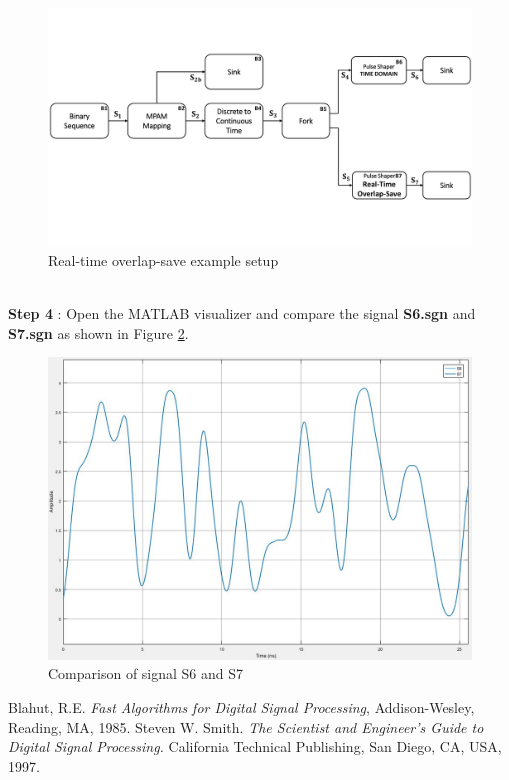 \begin{figure}[h]
	\centering
	\includegraphics[width=12cm]{./algorithms/overlap_save/figures/realTimeOverlapSave.pdf}
	\caption{Real-time overlap-save example setup}\label{realTimeOverlapSave}
\end{figure}\\
\textbf{Step 4} : Open the MATLAB visualizer and compare the signal \textbf{S6.sgn} and \textbf{S7.sgn} as shown in Figure \ref{S6S7}.
\begin{figure}[h]
	\centering
	\includegraphics[width=12cm]{./algorithms/overlap_save/figures/S6_S7.jpg}
	\caption{Comparison of signal S6 and S7}\label{S6S7}
\end{figure}

\begin{thebibliography}{1}
  Blahut, R.E. {\em Fast Algorithms for Digital Signal Processing}, Addison-Wesley, Reading, MA,
 1985.
  Steven W. Smith. {\em The Scientist and Engineer's Guide to Digital Signal Processing.} California Technical Publishing, San Diego, CA, USA, 1997.
\end{thebibliography}

%

